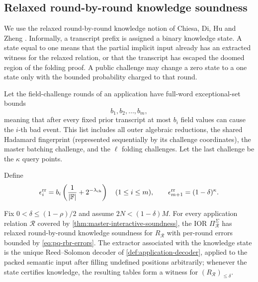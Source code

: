 \subsection{Relaxed round-by-round knowledge soundness}
\label{sec:pq-relaxed-rbr}

We use the relaxed round-by-round knowledge notion of Chiesa, Di, Hu and Zheng \cite{CDHZ25}.  Informally, a transcript prefix is assigned a binary knowledge state.  A state equal to one means that the partial implicit input already has an extracted witness for the relaxed relation, or that the transcript has escaped the doomed region of the folding proof.  A public challenge may change a zero state to a one state only with the bounded probability charged to that round.

Let the field-challenge rounds of an application have full-word exceptional-set bounds
\[
  b_1,b_2,\ldots,b_m,
\]
meaning that after every fixed prior transcript at most $b_i$ field values can cause the $i$-th bad event.  This list includes all outer algebraic reductions, the shared Hadamard fingerprint (represented sequentially by its challenge coordinates), the master batching challenge, and the $\ell$ folding challenges.  Let the last challenge be the $\kappa$ query points.

Define
\begin{equation}
  \epsilon_i^{\mathrm{rr}}
  =b_i\left(\frac1{|\mathbb{F}|}+2^{-\lambda_{\mathrm{ch}}}\right)
  \quad(1\le i\le m),
  \qquad
  \epsilon_{m+1}^{\mathrm{rr}}=(1-\delta)^\kappa.
  \label{eq:pq-rbr-errors}
\end{equation}

\begin{theorem}
\label{thm:pq-relaxed-rbr}
Fix $0<\delta\le(1-\rho)/2$ and assume $2N<(1-\delta)M$.  For every application relation $\mathcal R$ covered by \cref{thm:master-interactive-soundness}, the IOR $\Pi_{\mathcal R}^{\Sigma}$ has relaxed round-by-round knowledge soundness for $R_{\mathcal R}$ with per-round errors bounded by \eqref{eq:pq-rbr-errors}.  The extractor associated with the knowledge state is the unique Reed--Solomon decoder of \cref{def:application-decoder}, applied to the packed semantic input after filling undefined positions arbitrarily; whenever the state certifies knowledge, the resulting tables form a witness for $(R_{\mathcal R})_{\le\delta}$.
\end{theorem}


